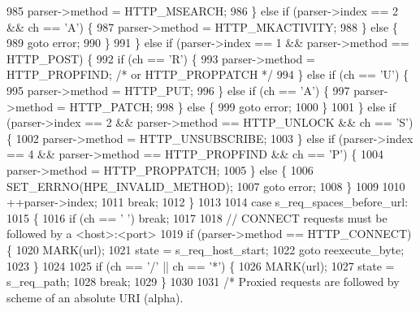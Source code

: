 \begin{DoxyCode}
985             parser->method = HTTP_MSEARCH;
986           \} \textcolor{keywordflow}{else} \textcolor{keywordflow}{if} (parser->index == 2 && ch == \textcolor{charliteral}{'A'}) \{
987             parser->method = HTTP_MKACTIVITY;
988           \} \textcolor{keywordflow}{else} \{
989             \textcolor{keywordflow}{goto} error;
990           \}
991         \} \textcolor{keywordflow}{else} \textcolor{keywordflow}{if} (parser->index == 1 && parser->method == HTTP_POST) \{
992           \textcolor{keywordflow}{if} (ch == \textcolor{charliteral}{'R'}) \{
993             parser->method = HTTP_PROPFIND; \textcolor{comment}{/* or HTTP\_PROPPATCH */}
994           \} \textcolor{keywordflow}{else} \textcolor{keywordflow}{if} (ch == \textcolor{charliteral}{'U'}) \{
995             parser->method = HTTP_PUT;
996           \} \textcolor{keywordflow}{else} \textcolor{keywordflow}{if} (ch == \textcolor{charliteral}{'A'}) \{
997             parser->method = HTTP_PATCH;
998           \} \textcolor{keywordflow}{else} \{
999             \textcolor{keywordflow}{goto} error;
1000           \}
1001         \} \textcolor{keywordflow}{else} \textcolor{keywordflow}{if} (parser->index == 2 && parser->method == HTTP_UNLOCK && ch == \textcolor{charliteral}{'S'}) \{
1002           parser->method = HTTP_UNSUBSCRIBE;
1003         \} \textcolor{keywordflow}{else} \textcolor{keywordflow}{if} (parser->index == 4 && parser->method == HTTP_PROPFIND && ch == \textcolor{charliteral}{'P'}) \{
1004           parser->method = HTTP_PROPPATCH;
1005         \} \textcolor{keywordflow}{else} \{
1006           SET_ERRNO(HPE_INVALID_METHOD);
1007           \textcolor{keywordflow}{goto} error;
1008         \}
1009 
1010         ++parser->index;
1011         \textcolor{keywordflow}{break};
1012       \}
1013 
1014       \textcolor{keywordflow}{case} s_req_spaces_before_url:
1015       \{
1016         \textcolor{keywordflow}{if} (ch == \textcolor{charliteral}{' '}) \textcolor{keywordflow}{break};
1017 
1018         \textcolor{comment}{// CONNECT requests must be followed by a <host>:<port>}
1019         \textcolor{keywordflow}{if} (parser->method == HTTP_CONNECT) \{
1020           MARK(url);
1021           state = s_req_host_start;
1022           \textcolor{keywordflow}{goto} reexecute\_byte;
1023         \}
1024 
1025         \textcolor{keywordflow}{if} (ch == \textcolor{charliteral}{'/'} || ch == \textcolor{charliteral}{'*'}) \{
1026           MARK(url);
1027           state = s_req_path;
1028           \textcolor{keywordflow}{break};
1029         \}
1030 
1031         \textcolor{comment}{/* Proxied requests are followed by scheme of an absolute URI (alpha).}

\end{DoxyCode}
